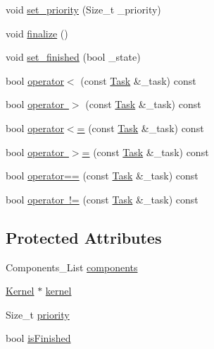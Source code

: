 \begin{DoxyCompactItemize}
\item 
void \mbox{\hyperlink{classbanita_1_1_task_a254be860b0f3f3c687b8f52e090de228}{set\+\_\+priority}} (Size\+\_\+t \+\_\+priority)
\item 
void \mbox{\hyperlink{classbanita_1_1_task_a5c635a75f1a8b735354d458684838d5b}{finalize}} ()
\item 
void \mbox{\hyperlink{classbanita_1_1_task_a3727f04d5ac8dcdf3ff41cc0609139e0}{set\+\_\+finished}} (bool \+\_\+state)
\item 
bool \mbox{\hyperlink{classbanita_1_1_task_ac088e4c87f080fb26dfdfc1ef13f78d6}{operator$<$}} (const \mbox{\hyperlink{classbanita_1_1_task}{Task}} \&\+\_\+task) const
\item 
bool \mbox{\hyperlink{classbanita_1_1_task_a2d5f75c11032d7b6a7c4e0697d4434b1}{operator $>$}} (const \mbox{\hyperlink{classbanita_1_1_task}{Task}} \&\+\_\+task) const
\item 
bool \mbox{\hyperlink{classbanita_1_1_task_a5fe48a7f1fc054c0f2376cf06853253c}{operator$<$=}} (const \mbox{\hyperlink{classbanita_1_1_task}{Task}} \&\+\_\+task) const
\item 
bool \mbox{\hyperlink{classbanita_1_1_task_ae5392bebeb2c9c1e8c83ab1e48446f90}{operator $>$=}} (const \mbox{\hyperlink{classbanita_1_1_task}{Task}} \&\+\_\+task) const
\item 
bool \mbox{\hyperlink{classbanita_1_1_task_af893f3c0cfefa81d9311c2b3532c597c}{operator==}} (const \mbox{\hyperlink{classbanita_1_1_task}{Task}} \&\+\_\+task) const
\item 
bool \mbox{\hyperlink{classbanita_1_1_task_a475f0812eff764bef68edefc3893df67}{operator !=}} (const \mbox{\hyperlink{classbanita_1_1_task}{Task}} \&\+\_\+task) const
\end{DoxyCompactItemize}
\subsection*{Protected Attributes}
\begin{DoxyCompactItemize}
\item 
Components\+\_\+\+List \mbox{\hyperlink{classbanita_1_1_task_aa0a41413c212ad29bb32bd74d35b0585}{components}}
\item 
\mbox{\hyperlink{classbanita_1_1_kernel}{Kernel}} $\ast$ \mbox{\hyperlink{classbanita_1_1_task_a6525188adf77e008e70e2b7cae631bd4}{kernel}}
\item 
Size\+\_\+t \mbox{\hyperlink{classbanita_1_1_task_ad2bb89f0c32415917e5b336fdcd9fd5d}{priority}}
\item 
bool \mbox{\hyperlink{classbanita_1_1_task_ac90bfd55ed4f8f90afa2984218c61433}{is\+Finished}}
\end{DoxyCompactItemize}


